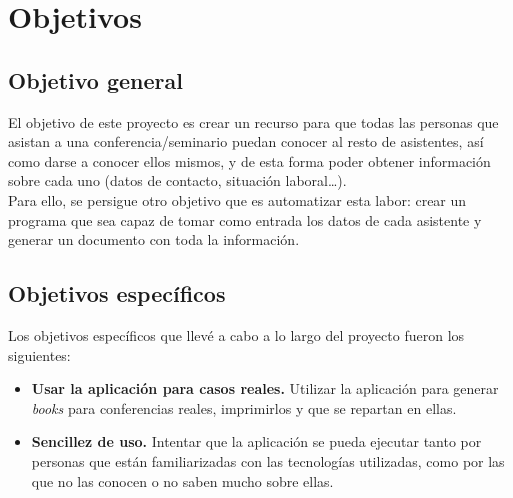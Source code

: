 \documentclass[a4paper, 12pt]{book}
\begin{document}

\cleardoublepage %
\chapter{Objetivos} %
\label{chap:objetivos} %

\section{Objetivo general} %
\label{sec:objetivo-general} %
El objetivo de este proyecto es crear un recurso para que todas las personas que asistan a una conferencia/seminario puedan conocer al resto de asistentes, así como darse a conocer ellos mismos, y de esta forma poder obtener información sobre cada uno (datos de contacto, situación laboral\ldots).\\

Para ello, se persigue otro objetivo que es automatizar esta labor: crear un programa que sea capaz de tomar como entrada los datos de cada asistente y generar un documento con toda la información.


\section{Objetivos específicos}
\label{sec:objetivos-especificos}
Los objetivos específicos que llevé a cabo a lo largo del proyecto fueron los siguientes:
\begin{itemize}
  \item \textbf{Usar la aplicación para casos reales.} Utilizar la aplicación para generar \textit{books} para conferencias reales, imprimirlos y que se repartan en ellas.
  \item \textbf{Sencillez de uso.} Intentar que la aplicación se pueda ejecutar tanto por personas que están familiarizadas con las tecnologías utilizadas, como por las que no las conocen o no saben mucho sobre ellas.
\end{itemize}
\end{document}

